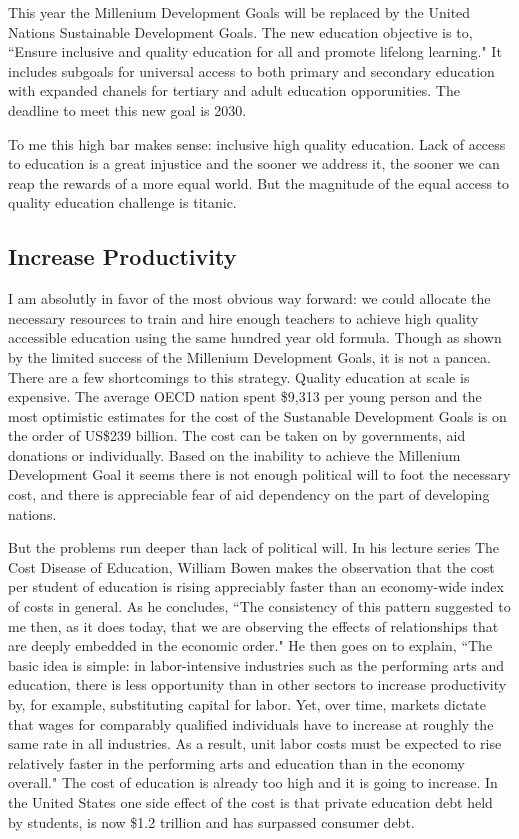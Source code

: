 This year the Millenium Development Goals will be replaced by the United Nations Sustainable Development Goals. The new education objective is to, ``Ensure inclusive and quality education for all and promote lifelong learning." It includes subgoals for universal access to both primary and secondary education with expanded chanels for tertiary and adult education opporunities. The deadline to meet this new goal is 2030. 

To me this high bar makes sense: inclusive high quality education. Lack of access to education is a great injustice and the sooner we address it, the sooner we can reap the rewards of a more equal world. But the magnitude of the equal access to quality education challenge is titanic. 

\subsection{Increase Productivity}

I am absolutly in favor of the most obvious way forward: we could allocate the necessary resources to train and hire enough teachers to achieve high quality accessible education using the same hundred year old formula. Though as shown by the limited success of the Millenium Development Goals, it is not a pancea. There are a few shortcomings to this strategy. Quality education at scale is expensive. The average OECD nation spent \$9,313 per young person \cite{annualOECDReport} and the most optimistic estimates for the cost of the Sustanable Development Goals is on the order of US\$239 billion. The cost can be taken on by governments, aid donations or individually. Based on the inability to achieve the Millenium Development Goal it seems there is not enough political will to foot the necessary cost, and there is appreciable fear of aid dependency on the part of developing nations. 

But the problems run deeper than lack of political will. In his lecture series The Cost Disease of Education, William Bowen makes the observation that the cost per student of education is rising appreciably faster than an economy-wide index of costs in general. As he concludes, ``The consistency of this pattern suggested to me then, as it does today, that we are observing the effects of relationships that are deeply embedded in the economic order." He then goes on to explain, ``The basic idea is simple: in labor-intensive industries such as
the performing arts and education, there is less opportunity than in other sectors
to increase productivity by, for example, substituting capital for labor. Yet, over
time, markets dictate that wages for comparably qualified individuals have to
increase at roughly the same rate in all industries. As a result, unit labor costs
must be expected to rise relatively faster in the performing arts and education
than in the economy overall." The cost of education is already too high and it is going to increase. In the United States one side effect of the cost is that private education debt held by students, is now \$1.2 trillion and has surpassed consumer debt. 

